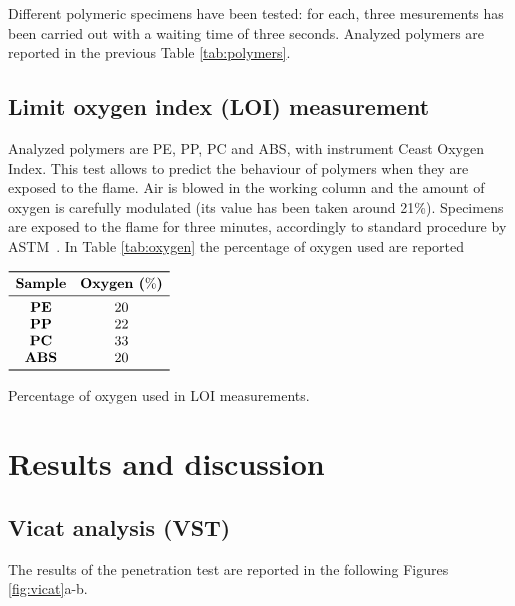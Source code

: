 \documentclass[a4paper, 11pt]{article}
\begin{document}
Different polymeric specimens have been tested: for each, three mesurements has been carried out with a waiting time of three seconds. Analyzed polymers are reported in the previous Table \ref{tab:polymers}.

\subsection{Limit oxygen index (LOI) measurement}

Analyzed polymers are PE, PP, PC and ABS, with instrument Ceast Oxygen Index. This test allows to predict the behaviour of polymers when they are exposed to the flame. Air is blowed in the working column and the amount of oxygen is carefully modulated (its value has been taken around 21\%). Specimens are exposed to the flame for three minutes, accordingly to standard procedure by ASTM~\cite{LOI}. In Table \ref{tab:oxygen} the percentage of oxygen used are reported
\begin{table}[htp]
	\centering
	$
	\begin{array}{cc}
	\toprule
	\textbf{Sample} & \textbf{Oxygen ($\%$)}\\
	\midrule
	\textbf{PE} & 20 \\
	\textbf{PP} & 22\\
	\textbf{PC} & 33 \\
	\textbf{ABS} & 20\\
	\bottomrule
	\end{array}
	$
	\caption{Percentage of oxygen used in LOI measurements.}
	\label{tab:oxygen}
\end{table}

\newpage

\section{Results and discussion}

\subsection{Vicat analysis (VST)}

The results of the penetration test are reported in the following Figures \ref{fig:vicat}a-b.
\end{document}
